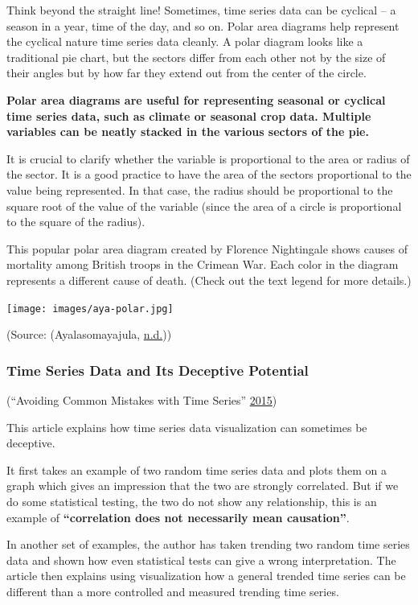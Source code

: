 \documentclass[]{book}
\begin{document}
Think beyond the straight line! Sometimes, time series data can be cyclical -- a season in a year, time of the day, and so on. Polar area diagrams help represent the cyclical nature time series data cleanly. A polar diagram looks like a traditional pie chart, but the sectors differ from each other not by the size of their angles but by how far they extend out from the center of the circle.

\textbf{Polar area diagrams are useful for representing seasonal or cyclical time series data, such as climate or seasonal crop data. Multiple variables can be neatly stacked in the various sectors of the pie.}

It is crucial to clarify whether the variable is proportional to the area or radius of the sector. It is a good practice to have the area of the sectors proportional to the value being represented. In that case, the radius should be proportional to the square root of the value of the variable (since the area of a circle is proportional to the square of the radius).

This popular polar area diagram created by Florence Nightingale shows causes of mortality among British troops in the Crimean War. Each color in the diagram represents a different cause of death. (Check out the text legend for more details.)

\texttt{[image: images/aya-polar.jpg]}

(Source: (Ayalasomayajula, \protect\hyperlink{ref-aya-time-series}{n.d.}))

\hypertarget{time-series-data-and-its-deceptive-potential}{%
\subsubsection{Time Series Data and Its Deceptive Potential}\label{time-series-data-and-its-deceptive-potential}}

(``Avoiding Common Mistakes with Time Series'' \protect\hyperlink{ref-TimeSeries}{2015})

This article explains how time series data visualization can sometimes be deceptive.

It first takes an example of two random time series data and plots them on a graph which gives an impression that the two are strongly correlated. But if we do some statistical testing, the two do not show any relationship, this is an example of \textbf{``correlation does not necessarily mean causation''}.

In another set of examples, the author has taken trending two random time series data and shown how even statistical tests can give a wrong interpretation. The article then explains using visualization how a general trended time series can be different than a more controlled and measured trending time series.
\end{document}
